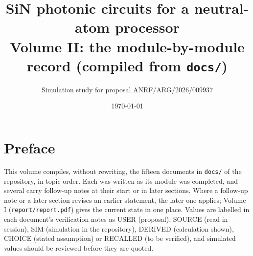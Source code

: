 \documentclass[10pt,a4paper,oneside]{report}
\title{SiN photonic circuits for a neutral-atom processor\\[4pt]
  \large Volume II: the module-by-module record (compiled from \texttt{docs/})}
\author{Simulation study for proposal ANRF/ARG/2026/009937}
\date{\today}
\begin{document}
\maketitle
\chapter*{Preface}
This volume compiles, without rewriting, the fifteen documents in \texttt{docs/} of the repository, in topic
order. Each was written as its module was completed, and several carry follow-up notes at their start or in
later sections. Where a follow-up note or a later section revises an earlier statement, the later one applies;
Volume I (\texttt{report/report.pdf}) gives the current state in one place. Values are labelled in each
document's verification notes as USER (proposal), SOURCE (read in session), SIM (simulation in the repository),
DERIVED (calculation shown), CHOICE (stated assumption) or RECALLED (to be verified), and simulated values should
be reviewed before they are quoted.
\tableofcontents

\end{document}

